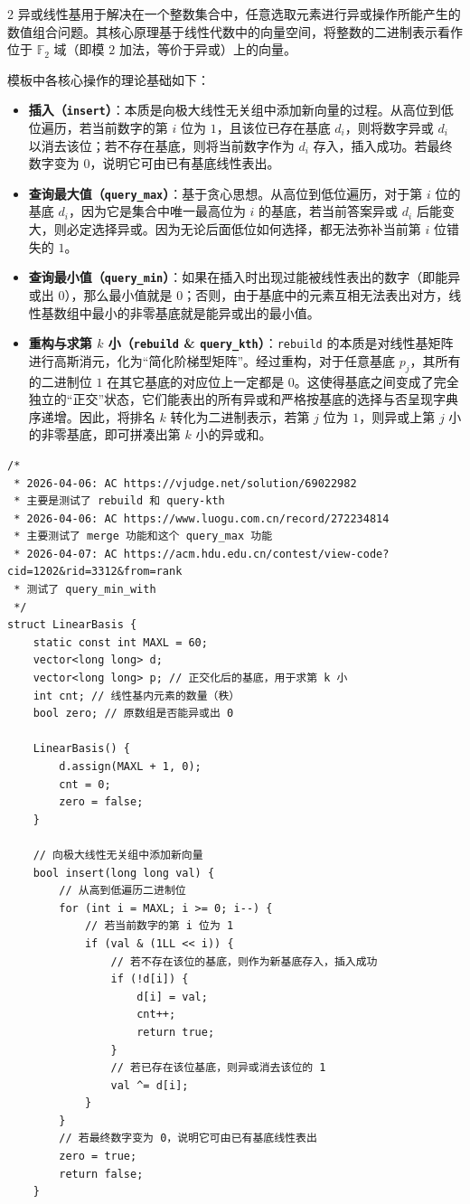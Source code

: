 \begin{multicols*}{2}
		异或线性基用于解决在一个整数集合中，任意选取元素进行异或操作所能产生的数值组合问题。其核心原理基于线性代数中的向量空间，将整数的二进制表示看作位于 $\mathbb{F}_2$ 域（即模 $2$ 加法，等价于异或）上的向量。

		模板中各核心操作的理论基础如下：
		\begin{itemize}
			\item \textbf{插入（\texttt{insert}）}：本质是向极大线性无关组中添加新向量的过程。从高位到低位遍历，若当前数字的第 $i$ 位为 $1$，且该位已存在基底 $d_i$，则将数字异或 $d_i$ 以消去该位；若不存在基底，则将当前数字作为 $d_i$ 存入，插入成功。若最终数字变为 $0$，说明它可由已有基底线性表出。
			\item \textbf{查询最大值（\texttt{query\_max}）}：基于贪心思想。从高位到低位遍历，对于第 $i$ 位的基底 $d_i$，因为它是集合中唯一最高位为 $i$ 的基底，若当前答案异或 $d_i$ 后能变大，则必定选择异或。因为无论后面低位如何选择，都无法弥补当前第 $i$ 位错失的 $1$。
			\item \textbf{查询最小值（\texttt{query\_min}）}：如果在插入时出现过能被线性表出的数字（即能异或出 $0$），那么最小值就是 $0$；否则，由于基底中的元素互相无法表出对方，线性基数组中最小的非零基底就是能异或出的最小值。
			\item \textbf{重构与求第 $k$ 小（\texttt{rebuild} \& \texttt{query\_kth}）}：\texttt{rebuild} 的本质是对线性基矩阵进行高斯消元，化为“简化阶梯型矩阵”。经过重构，对于任意基底 $p_j$，其所有的二进制位 $1$ 在其它基底的对应位上一定都是 $0$。这使得基底之间变成了完全独立的“正交”状态，它们能表出的所有异或和严格按基底的选择与否呈现字典序递增。因此，将排名 $k$ 转化为二进制表示，若第 $j$ 位为 $1$，则异或上第 $j$ 小的非零基底，即可拼凑出第 $k$ 小的异或和。
		\end{itemize}

		\begin{verbatim}
/*
 * 2026-04-06: AC https://vjudge.net/solution/69022982
 * 主要是测试了 rebuild 和 query-kth
 * 2026-04-06: AC https://www.luogu.com.cn/record/272234814
 * 主要测试了 merge 功能和这个 query_max 功能
 * 2026-04-07: AC https://acm.hdu.edu.cn/contest/view-code?cid=1202&rid=3312&from=rank
 * 测试了 query_min_with
 */
struct LinearBasis {
	static const int MAXL = 60;
	vector<long long> d;
	vector<long long> p; // 正交化后的基底，用于求第 k 小
	int cnt; // 线性基内元素的数量（秩）
	bool zero; // 原数组是否能异或出 0

	LinearBasis() {
		d.assign(MAXL + 1, 0);
		cnt = 0;
		zero = false;
	}

	// 向极大线性无关组中添加新向量
	bool insert(long long val) {
		// 从高到低遍历二进制位
		for (int i = MAXL; i >= 0; i--) {
			// 若当前数字的第 i 位为 1
			if (val & (1LL << i)) {
				// 若不存在该位的基底，则作为新基底存入，插入成功
				if (!d[i]) {
					d[i] = val;
					cnt++;
					return true;
				}
				// 若已存在该位基底，则异或消去该位的 1
				val ^= d[i];
			}
		}
		// 若最终数字变为 0，说明它可由已有基底线性表出
		zero = true;
		return false;
	}


\end{verbatim}
\end{multicols*}

